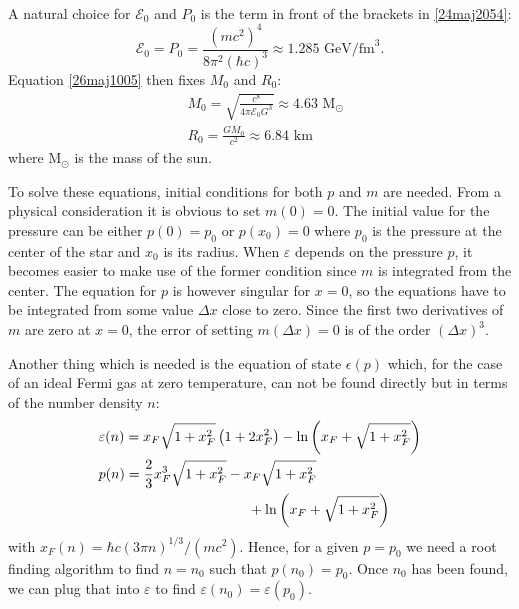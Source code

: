 \documentclass[twocolumn]{article}
\begin{document}
\begin{large}
\begin{equation}
\begin{split}
    \end{split}
\end{equation}
A natural choice for $\mathcal{E}_0$ and $P_0$ is the term in front of the brackets in \eqref{24maj2054}:
\begin{equation}
    \mathcal{E}_0 = P_0 = \frac{(mc^2)^4}{8\pi^2(\hbar c)^3} \approx 1.285 \text{ GeV/fm}^3.
\end{equation}
Equation \eqref{26maj1005} then fixes $M_0$ and $R_0$:
\begin{equation}
    \begin{split}
    &M_0 = \sqrt{\frac{c^8}{4\pi\mathcal{E}_0G^3}} \approx 4.63 \text{ M}_\odot \\ 
    &R_0 = \frac{GM_0}{c^2} \approx 6.84 \text{ km}
    \end{split}
\end{equation}
where M$_\odot$ is the mass of the sun.


To solve these equations, initial conditions for both $p$ and $m$ are needed. From a physical consideration it is obvious to set $m(0)=0$. The initial value for the pressure can be either $p(0) = p_0$ or $p(x_0) = 0$ where $p_0$ is the pressure at the center of the star and $x_0$ is its radius. When $\varepsilon$ depends on the pressure $p$, it becomes easier to make use of the former condition since $m$ is integrated from the center. The equation for $p$ is however singular for $x=0$, so the equations have to be integrated from some value $\Delta x$ close to zero. Since the first two derivatives of $m$ are zero at $x=0$, the error of setting $m(\Delta x) = 0$ is of the order $(\Delta x)^3$.

Another thing which is needed is the equation of state $\epsilon(p)$ which, for the case of an ideal Fermi gas at zero temperature, can not be found directly but in terms of the number density $n$:
\begin{equation}
    \label{24maj1641}
    \begin{split}
        &\varepsilon(n) = x_F\sqrt{1+x_F^2}\left(1+2x_F^2\right)-\ln\left(x_F+\sqrt{1+x_F^2}\right) \\ 
        &p(n) = \frac{2}{3}x_F^3\sqrt{1+x_F^2}-x_F\sqrt{1+x_F^2} \\ 
        &\hspace{3.75cm}+\ln\left(x_F+\sqrt{1+x_F^2}\right)
    \end{split}
\end{equation}
with $x_F(n)=\hbar c(3\pi n)^{1/3}/(mc^2)$. Hence, for a given $p=p_0$ we need a root finding algorithm to find $n=n_0$ such that $p(n_0) = p_0$. Once $n_0$ has been found, we can plug that into $\varepsilon$ to find $\varepsilon(n_0)=\varepsilon(p_0)$. 


\end{large}
\end{document}
